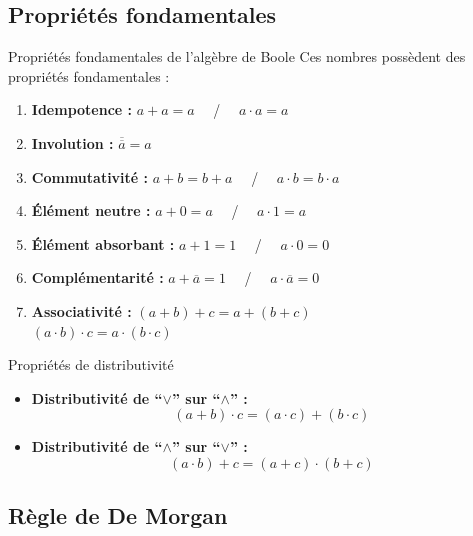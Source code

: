 \documentclass[a4paper,12pt]{article}
\begin{document}
\subsection{Propriétés fondamentales}

\begin{propbox}{Propriétés fondamentales de l'algèbre de Boole}
Ces nombres possèdent des propriétés fondamentales :

\begin{enumerate}[leftmargin=2cm]
    \item \textbf{Idempotence :} $a + a = a$ ~~/~~ $a \cdot a = a$
    
    \item \textbf{Involution :} $\overline{\overline{a}} = a$
    
    \item \textbf{Commutativité :} $a + b = b + a$ ~~/~~ $a \cdot b = b \cdot a$
    
    \item \textbf{Élément neutre :} $a + 0 = a$ ~~/~~ $a \cdot 1 = a$
    
    \item \textbf{Élément absorbant :} $a + 1 = 1$ ~~/~~ $a \cdot 0 = 0$
    
    \item \textbf{Complémentarité :} $a + \overline{a} = 1$ ~~/~~ $a \cdot \overline{a} = 0$
    
    \item \textbf{Associativité :} $(a + b) + c = a + (b + c)$ \\
    $(a \cdot b) \cdot c = a \cdot (b \cdot c)$
\end{enumerate}
\end{propbox}

\begin{propbox}{Propriétés de distributivité}
\begin{itemize}
    \item \textbf{Distributivité de ``$\vee$'' sur ``$\wedge$'' :}
    \[(a + b) \cdot c = (a \cdot c) + (b \cdot c)\]
    
    \item \textbf{Distributivité de ``$\wedge$'' sur ``$\vee$'' :}
    \[(a \cdot b) + c = (a + c) \cdot (b + c)\]
\end{itemize}
\end{propbox}

\subsection{Règle de De Morgan}
\end{document}

